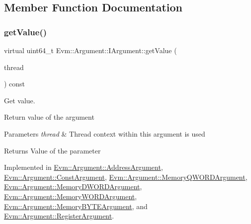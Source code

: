 \subsection{Member Function Documentation}
\mbox{\label{struct_evm_1_1_argument_1_1_i_argument_af01db10f34498344831877847c2fc038}} 
\subsubsection{\texorpdfstring{get\+Value()}{getValue()}}
{\footnotesize\ttfamily virtual uint64\+\_\+t Evm\+::\+Argument\+::\+I\+Argument\+::get\+Value (\begin{DoxyParamCaption}\item[{\mbox{\hyperlink{struct_evm_1_1_thread_context}{Thread\+Context}} \&}]{thread }\end{DoxyParamCaption}) const\hspace{0.3cm}{\ttfamily [pure virtual]}}



Get value. 

Return value of the argument 
\begin{DoxyParams}{Parameters}
{\em thread} & Thread context within this argument is used \\
\hline
\end{DoxyParams}
\begin{DoxyReturn}{Returns}
Value of the parameter 
\end{DoxyReturn}


Implemented in \mbox{\hyperlink{struct_evm_1_1_argument_1_1_address_argument_a8dfdf1626e06e7c72af39ca3f09ecec7}{Evm\+::\+Argument\+::\+Address\+Argument}}, \mbox{\hyperlink{struct_evm_1_1_argument_1_1_const_argument_abd4e5bb5fdad5eb9bd76436ea9c6836c}{Evm\+::\+Argument\+::\+Const\+Argument}}, \mbox{\hyperlink{struct_evm_1_1_argument_1_1_memory_q_w_o_r_d_argument_a07ee2f720366e41d8509f3c5aef8a46a}{Evm\+::\+Argument\+::\+Memory\+Q\+W\+O\+R\+D\+Argument}}, \mbox{\hyperlink{struct_evm_1_1_argument_1_1_memory_d_w_o_r_d_argument_a2236851a43925f9c93db6d107bc5986e}{Evm\+::\+Argument\+::\+Memory\+D\+W\+O\+R\+D\+Argument}}, \mbox{\hyperlink{struct_evm_1_1_argument_1_1_memory_w_o_r_d_argument_a689f534d26558b10f9d10ae80e221dee}{Evm\+::\+Argument\+::\+Memory\+W\+O\+R\+D\+Argument}}, \mbox{\hyperlink{struct_evm_1_1_argument_1_1_memory_b_y_t_e_argument_af038f3d7e425ef70f5688bda45eb8d31}{Evm\+::\+Argument\+::\+Memory\+B\+Y\+T\+E\+Argument}}, and \mbox{\hyperlink{struct_evm_1_1_argument_1_1_register_argument_aa2bb3ec054c1370ccde12b283f9887b1}{Evm\+::\+Argument\+::\+Register\+Argument}}.

